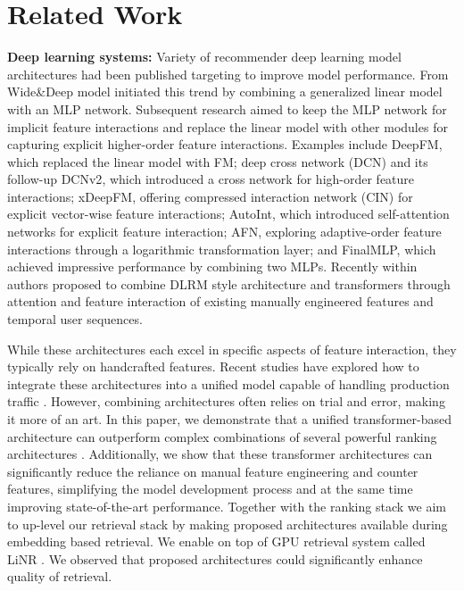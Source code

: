 \section{Related Work}
\label{sec:related_work}

\textbf{Deep learning systems:} Variety of recommender deep learning model architectures had been published targeting to improve model performance.  From Wide\&Deep model\cite{wideDeep2016} initiated this trend by combining a generalized linear model with an MLP network. Subsequent research aimed to keep the MLP network for implicit feature interactions and replace the linear model with other modules for capturing explicit higher-order feature interactions. Examples include DeepFM\cite{Guo2017DeepFMAF}, which replaced the linear model with FM; deep cross network (DCN)\cite{Wang2017DeepC} and its follow-up DCNv2\cite{Wang2020DCNVI}, which introduced a cross network for high-order feature interactions; xDeepFM\cite{Lian2018xDeepFMCE}, offering compressed interaction network (CIN) for explicit vector-wise feature interactions; AutoInt\cite{Song2018AutoIntAF}, which introduced self-attention networks for explicit feature interaction; AFN\cite{Cheng2019AdaptiveFN}, exploring adaptive-order feature interactions through a logarithmic transformation layer; and FinalMLP\cite{Mao2023FinalMLPAE}, which achieved impressive performance by combining two MLPs. Recently within \cite{zeng2024interformer} authors proposed to combine DLRM style architecture and transformers through attention and feature interaction of existing manually engineered features and temporal user sequences.

While these architectures each excel in specific aspects of feature interaction, they typically rely on handcrafted features. Recent studies have explored how to integrate these architectures into a unified model capable of handling production traffic \cite{LiRank_paper}. However, combining architectures often relies on trial and error, making it more of an art.
In this paper, we demonstrate that a unified transformer-based architecture can outperform complex combinations of several powerful ranking architectures \cite{LiRank_paper}. Additionally, we show that these transformer architectures can significantly reduce the reliance on manual feature engineering and counter features, simplifying the model development process and at the same time improving state-of-the-art performance. Together with the ranking stack we aim to up-level our retrieval stack by making proposed architectures available during embedding based retrieval. We enable {\systemname} on top of GPU retrieval system called LiNR \cite{Linr_paper}. We observed that proposed architectures could significantly enhance quality of retrieval.


